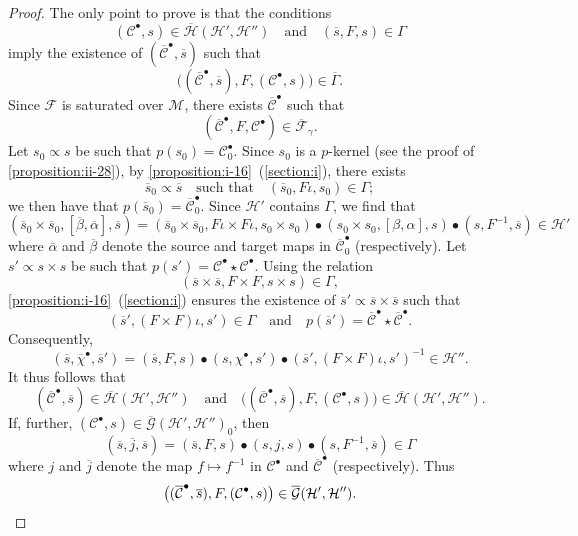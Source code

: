 \documentclass[a4paper,fleqn]{article}
\theoremstyle{plain}
\theoremstyle{definition}
\newcommand{\oldpage}[1]{{\marginpar{\footnotesize$\bigg\vert$\,\,\,\,\textit{p.~#1}}}}
\newcommand{\textand}{\quad\text{and}\quad}
\newcommand{\CC}{\mathcal{C}}
\newcommand{\HH}{\mathcal{H}}
\newcommand{\MM}{\mathcal{M}}
\newcommand{\FF}{\mathcal{F}}
\newcommand{\subs}{\mathrel{\propto}}
\newcommand{\GG}{\mathcal{G}}
\newcommand{\smallbullet}{\bullet}
\begin{document}
\begin{proof}
  The only point to prove is that the conditions
  \[
    (\CC^\smallbullet,s)\in\overline{\HH}(\HH',\HH'')
    \textand
    (\overline{s},F,s)\in\Gamma
  \]
  imply the existence of $(\overline{\CC}^\smallbullet,\overline{s})$ such that
  \[
    \big((\overline{\CC}^\smallbullet,\overline{s}),F,(\CC^\smallbullet,s)\big)
    \in\overline{\Gamma}.
  \]
  Since $\FF$ is saturated over $\MM$, there exists $\overline{\CC}^\smallbullet$ such that
  \[
    (\overline{\CC}^\smallbullet,F,\CC^\smallbullet)
    \in\overline{\FF}_\gamma.
  \]
  \oldpage{413}
  Let $s_0\subs s$ be such that $p(s_0)=\CC_0^\smallbullet$.
  Since $s_0$ is a $p$-kernel (see the proof of \cref{proposition:ii-28}), by \cref{proposition:i-16}~(\cref{section:i}), there exists
  \[
    \overline{s}_0\subs\overline{s}
    \quad\text{such that}\quad
    (\overline{s}_0,F\iota,s_0)
    \in\Gamma;
  \]
  we then have that $p(\overline{s}_0)=\overline{\CC}_0^\smallbullet$.
  Since $\HH'$ contains $\Gamma$, we find that
  \[
    (\overline{s}_0\times\overline{s}_0,[\overline{\beta},\overline{\alpha}],\overline{s})
    = (\overline{s}_0\times\overline{s}_0,F\iota\times F\iota,s_0\times s_0)\smallbullet(s_0\times s_0,[\beta,\alpha],s)\smallbullet(s,F^{-1},\overline{s})
    \in\HH'
  \]
  where $\overline{\alpha}$ and $\overline{\beta}$ denote the source and target maps in $\overline{\CC}_0^\smallbullet$ (respectively).
  Let $s'\subs s\times s$ be such that $p(s')=\CC^\smallbullet\star\CC^\smallbullet$.
  Using the relation
  \[
    (\overline{s}\times\overline{s},F\times F,s\times s)
    \in\Gamma,
  \]
  \cref{proposition:i-16}~(\cref{section:i}) ensures the existence of $\overline{s}'\subs\overline{s}\times\overline{s}$ such that
  \[
    (\overline{s}',(F\times F)\iota,s')\in\Gamma
    \textand
    p(\overline{s}')=\overline{\CC}^\smallbullet\star\overline{\CC}^\smallbullet.
  \]
  Consequently,
  \[
    (\overline{s},\overline{\chi}^\smallbullet,\overline{s}')
    = (\overline{s},F,s)\smallbullet(s,\chi^\smallbullet,s')\smallbullet(\overline{s}',(F\times F)\iota,s')^{-1}
    \in\HH''.
  \]
  It thus follows that
  \[
    (\overline{\CC}^\smallbullet,\overline{s})\in\overline{\HH}(\HH',\HH'')
    \textand
    \big((\overline{\CC}^\smallbullet,\overline{s}),F,(\CC^\smallbullet,s)\big)\in\overline{\HH}(\HH',\HH'').
  \]
  If, further, $(\CC^\smallbullet,s)\in\overline{\GG}(\HH',\HH'')_0$, then
  \[
    (\overline{s},\overline{j},\overline{s})
    = (\overline{s},F,s)\smallbullet(s,j,s)\smallbullet(s,F^{-1},\overline{s})
    \in\Gamma
  \]
  where $j$ and $\overline{j}$ denote the map $f\mapsto f^{-1}$ in $\CC^\smallbullet$ and $\overline{\CC}^\smallbullet$ (respectively).
  Thus
  \[
    \big((\overline{\CC}^\smallbullet,\overline{s}),F,(\CC^\smallbullet,s)\big)
    \in\overline{\GG}(\HH',\HH'').
    \qedhere
  \]
\end{proof}
\end{document}
